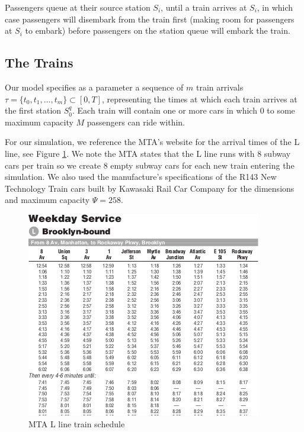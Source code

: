 \documentclass[12pt]{article}
\begin{document}
Passengers queue at their source station $S_i$, until a train arrives at $S_i$, in which case passengers will disembark from the train first (making room for passengers at $S_i$ to embark) before passengers on the station queue will embark the train.

\subsection{The Trains}

Our model specifies as a parameter a sequence of $m$ train arrivals $\tau = \{ t_0, t_1, ... , t_m \} \subset [0, T]$, representing the times at which each train arrives at the first station $S_0^q$.
Each train will contain one or more cars in which $0$ to some maximum capacity $M$ passengers can ride within.

For our simulation, we reference the MTA's website for the arrival times of the L line, see Figure \ref{train-schedule}.
We note the MTA states that the L line runs with 8 subway cars per train so we create 8 empty subway cars for each new train entering the simulation. We also used the manufacture's specifications of the R143 New Technology Train cars built by Kawasaki Rail Car Company for the dimensions and maximum capacity $\Psi=258$.

\begin{figure}[h]
\centering
\includegraphics[scale=1.0]{./figures/l-line-scheule-snip.png}
\caption{MTA L line train schedule}
\label{train-schedule}
\end{figure}
\end{document}
